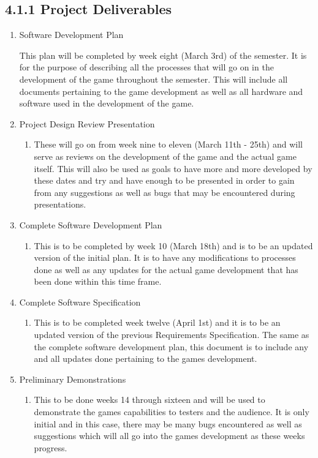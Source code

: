 \documentclass{article}
\begin{document}
\subsection{4.1.1 Project Deliverables}
\begin{enumerate}
\item Software Development Plan
	\begin{enumerate}
	This plan will be completed by week eight (March 3rd) of the semester. It is for the purpose of describing all the processes that will go on in the development of the game throughout the semester. This will include all documents pertaining to the game development as well as all hardware and software used in the development of the game.
	\end{enumerate}
\item Project Design Review Presentation
	\begin{enumerate}
	\item These will go on from week nine to eleven (March 11th - 25th) and will serve as reviews on the development of the game and the actual game itself. This will also be used as goals to have more and more developed by these dates and try and have enough to be presented in order to gain from any suggestions as well as bugs that may be encountered during presentations. 
	\end{enumerate}
\item Complete Software Development Plan
	\begin{enumerate}
	\item This is to be completed by week 10 (March 18th) and is to be an updated version of the initial plan. It is to have any modifications to processes done as well as any updates for the actual game development that has been done within this time frame.
	\end{enumerate}
\item Complete Software Specification
	\begin{enumerate}
	\item This is to be completed week twelve (April 1st) and it is to be an updated version of the previous Requirements Specification. The same as the complete software development plan, this document is to include any and all updates done pertaining to the games development.
	\end{enumerate}
\item Preliminary Demonstrations
	\begin{enumerate}
	\item This to be done weeks 14 through sixteen and will be used to demonstrate the games capabilities to testers and the audience. It is only initial and in this case, there may be many bugs encountered as well as suggestions which will all go into the games development as these weeks progress.

\end{enumerate}
\end{enumerate}
\end{document}
